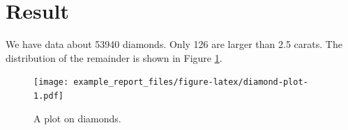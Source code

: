 \documentclass[a4paper,10pt]{article}
\begin{document}
\hypertarget{result}{%
\section{Result}\label{result}}

We have data about 53940 diamonds. Only
126 are larger than
2.5 carats. The distribution of the remainder is shown in Figure \ref{fig:diamond-plot}.

\begin{figure}
\centering
\texttt{[image: example\_report\_files/figure-latex/diamond-plot-1.pdf]}
\caption{\label{fig:diamond-plot}A plot on diamonds.}
\end{figure}

\newpage
\printbibliography[title=References]
\end{document}
